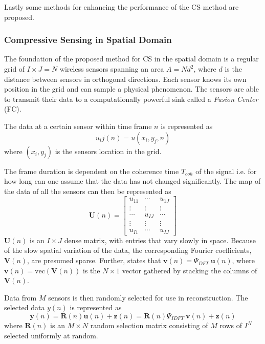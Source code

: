 \documentclass[Main]{subfiles}
\begin{document}
		Lastly some methods for enhancing the performance of the CS method are proposed.
		
		\subsubsection{Compressive Sensing in Spatial Domain} %
		\label{sub:compressive_sensing_in_spatial_domain}

			The foundation of the proposed method for CS in the spatial domain is a regular grid of $I \times J = N$ wireless sensors spanning an area $A = Nd^2$, where $d$ is the distance between sensors in orthogonal directions.
			Each sensor knows its own position in the grid and can sample a physical phenomenon.
			The sensors are able to transmit their data to a computationally powerful sink called a \emph{Fusion Center} (FC).

			The data at a certain sensor within time frame $n$ is represented as
			\begin{equation}
				u_ij(n) = u(x_i, y_j, n)
			\end{equation}
			where $(x_i, y_j)$ is the sensors location in the grid.

			The frame duration is dependent on the coherence time $T_{coh}$ of the signal i.e. for how long can one assume that the data has not changed significantly.
			The map of the data of all the sensors can then be represented as
			\begin{equation}
				\mathbf{U}(n) =
			 	\begin{bmatrix}
			  		u_{11}	&	\cdots 	& 	u_{1J}	\\
			  		\vdots	&	\vdots	&	\vdots	\\
					\cdots 	& 	u_{IJ}	& 	\cdots 	\\
					\vdots	&	\vdots	&	\vdots	\\
					u_{I1} 	& 	\cdots 	& 	u_{IJ}
				\end{bmatrix}
				\label{eq:dataMap}
			\end{equation}
			$\mathbf{U}(n)$ is an $I \times J$ dense matrix, with entries that vary slowly in space.
			Because of the slow spatial variation of the data, the corresponding Fourier coefficients, $\mathbf{V}(n)$, are presumed sparse.
			Further, \cite{Fazel2011} states that $\mathbf{v}(n) = \Psi_{DFT}\ \mathbf{u}(n)$, where $\mathbf{v}(n) = \text{vec}(\mathbf{V}(n))$ is the $N \times 1$ vector gathered by stacking the columns of $\mathbf{V}(n)$.

			Data from $M$ sensors is then randomly selected for use in reconstruction.
			The selected data $y(n)$ is represented as
			\begin{equation}
				\mathbf{y}(n) = 
					\mathbf{R}(n) \mathbf{u}(n) + \mathbf{z}(n)
					= \mathbf{R}(n) \Psi_{IDFT}\ \mathbf{v}(n) + \mathbf{z}(n)
			\end{equation}
			where $\mathbf{R}(n)$ is an $M \times N$ random selection matrix consisting of $M$ rows of $I^N$ selected uniformly at random.
\end{document}
